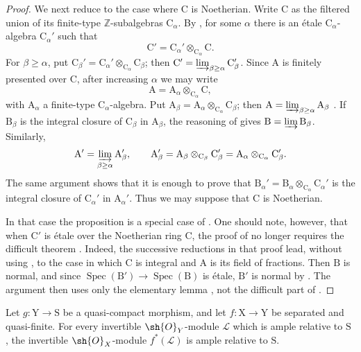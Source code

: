 \begin{proof}
We next reduce to the case where $\mathrm{C}$ is Noetherian. Write $\mathrm{C}$ as the filtered union of its finite-type $\mathbb{Z}$-subalgebras $\mathrm{C}_\alpha$. By , for some $\alpha$ there is an \'etale $\mathrm{C}_\alpha$-algebra $\mathrm{C}_\alpha'$ such that
\[
  \mathrm{C}'=\mathrm{C}_\alpha'\otimes_{\mathrm{C}_\alpha}\mathrm{C}.
\]
For $\beta\geq\alpha$, put $\mathrm{C}_\beta'=\mathrm{C}_\alpha'\otimes_{\mathrm{C}_\alpha}\mathrm{C}_\beta$; then $\mathrm{C}'=\varinjlim_{\beta\geq\alpha}\mathrm{C}_\beta'$. Since $\mathrm{A}$ is finitely presented over $\mathrm{C}$, after increasing $\alpha$ we may write
\[
  \mathrm{A}=\mathrm{A}_\alpha\otimes_{\mathrm{C}_\alpha}\mathrm{C},
\]
with $\mathrm{A}_\alpha$ a finite-type $\mathrm{C}_\alpha$-algebra. Put $\mathrm{A}_\beta=\mathrm{A}_\alpha\otimes_{\mathrm{C}_\alpha}\mathrm{C}_\beta$; then $\mathrm{A}=\varinjlim_{\beta\geq\alpha}\mathrm{A}_\beta$ . If $\mathrm{B}_\beta$ is the integral closure of $\mathrm{C}_\beta$ in $\mathrm{A}_\beta$, the reasoning of  gives $\mathrm{B}=\varinjlim\mathrm{B}_\beta$. Similarly,
\[
  \mathrm{A}'=\varinjlim_{\beta\geq\alpha}\mathrm{A}_\beta',
  \qquad
  \mathrm{A}_\beta'
   =\mathrm{A}_\beta\otimes_{\mathrm{C}_\beta}\mathrm{C}_\beta'
   =\mathrm{A}_\alpha\otimes_{\mathrm{C}_\alpha}\mathrm{C}_\beta'.
\]
The same argument shows that it is enough to prove that $\mathrm{B}_\alpha'=\mathrm{B}_\alpha\otimes_{\mathrm{C}_\alpha}\mathrm{C}_\alpha'$ is the integral closure of $\mathrm{C}_\alpha'$ in $\mathrm{A}_\alpha'$. Thus we may suppose that $\mathrm{C}$ is Noetherian.

In that case the proposition is a special case of . One should note, however, that when $\mathrm{C}'$ is \'etale over the Noetherian ring $\mathrm{C}$, the proof of  no longer requires the difficult theorem . Indeed, the successive reductions in that proof lead, without using , to the case in which $\mathrm{C}$ is integral and $\mathrm{A}$ is its field of fractions. Then $\mathrm{B}$ is normal, and since $\operatorname{Spec}(\mathrm{B}')\to\operatorname{Spec}(\mathrm{B})$ is \'etale, $\mathrm{B}'$ is normal by . The argument then uses only the elementary lemma , not the difficult part of .
\end{proof}

\begin{proposition}[18.12.16]
\label{IV.18.12.16}
Let $g:\mathrm{Y}\to\mathrm{S}$ be a quasi-compact morphism, and let $f:\mathrm{X}\to\mathrm{Y}$ be separated and quasi-finite.
For every invertible $\sh{O}_Y$-module $\mathscr{L}$ which is ample relative to $\mathrm{S}$ , the invertible $\sh{O}_X$-module $f^*(\mathscr{L})$ is ample relative to $\mathrm{S}$.
\end{proposition}

